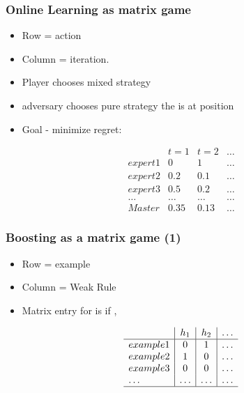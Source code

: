 \documentclass[handout]{beamer}
\begin{document}
\begin{frame}
\frametitle{Online Learning as matrix game}
  \begin{itemize}
  \item Row = action
  \item Column = iteration.
  \item Player chooses mixed strategy 
  \item adversary chooses pure strategy  the  is at position 
  \item Goal  - minimize regret: 
  \end{itemize}
\[  \begin{array}{l|c|c|c}
      & t=1 & t=2 & \ldots  \\
      \hline
    expert 1 & 0    & 1 & \ldots\\
    expert 2 & 0.2    & 0.1  & \ldots\\
    expert 3 & 0.5    & 0.2  & \ldots\\
      \ldots & \ldots    & \ldots  & \ldots\\
      \hline
    Master & 0.35 & 0.13 & \ldots 
    \end{array}
\]
\end{frame}

\begin{frame}
\frametitle{Boosting as a matrix game (1)}
  \begin{itemize}
  \item Row = example 
  \item Column = Weak Rule 
  \item Matrix entry for  is  if ,
     
\end{itemize}
\[  \begin{array}{l|c|c|c}
      & h_1 & h_2 & \ldots  \\
      \hline
    example 1 & 0    & 1 & \ldots\\
    example 2 & 1    & 0  & \ldots\\
    example 3 & 0    & 0  & \ldots\\
      \ldots & \ldots    & \ldots  & \ldots\\
      \hline
    \end{array}
  \]
\end{frame}
\end{document}
